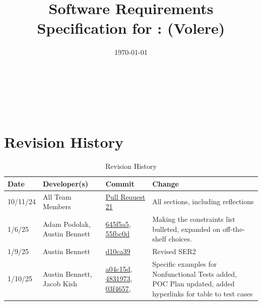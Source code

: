 \documentclass[12pt]{article}
\begin{document}
\title{Software Requirements Specification for \progname: (Volere)} 
\author{\authname}
\date{\today}
	
\maketitle

~\newpage


\tableofcontents

~\newpage

\section*{Revision History}

\begin{table}[htp]
\centering
\caption{Revision History}
\label{TblRevisionHistory}
\begin{tabularx}{\textwidth}{l l l X}
\toprule
\textbf{Date} & \textbf{Developer(s)} & \textbf{Commit} & \textbf{Change}\\

\midrule
10/11/24 & 
All Team Members & 
\href{https://github.com/ausbennett/mes-finance-platform/pull/21}{Pull Request 21} & 
All sections, including reflections\\

\midrule
1/6/25 & 
  Adam Podolak, Austin Bennett & 
\href{https://github.com/ausbennett/mes-finance-platform/commit/645f5a5ecfee7cc2adbb784888d733d815d3080f}{645f5a5}, \href{https://github.com/ausbennett/mes-finance-platform/commit/55fbc0d26a10b56f90c50919de7a8c9ca920ec11}{55fbc0d}  & Making the constraints list bulleted, expanded on off-the-shelf choices. \\

\midrule
1/9/25 & 
Austin Bennett & 
\href{https://github.com/ausbennett/mes-finance-platform/commit/d10ca390135f3c6f5a7b2c8f237c3575501a2a7f}{d10ca39} & 
Revised SER2\\

\midrule
1/10/25 & 
Austin Bennett, Jacob Kish & 
\href{https://github.com/ausbennett/mes-finance-platform/commit/a04c15d0b1c09c4224c563c3293413720992000f}{a04c15d}, 
\href{https://github.com/ausbennett/mes-finance-platform/commit/4831973b5533e5ae9d6ae4e884bd0cfebb49792d}{4831973},
\href{https://github.com/ausbennett/mes-finance-platform/commit/03f46579d128fbf9c896b3c4cba2601181f4d5c1}{03f4657}, & 
Specific examples for Nonfunctional Tests added, POC Plan updated, added hyperlinks for table to test cases\\

\bottomrule
\end{tabularx}
\end{table}
\end{document}
